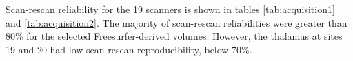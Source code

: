 Scan-rescan reliability for the 19 scanners is shown in tables \ref{tab:acquisition1} and \ref{tab:acquisition2}. The majority of scan-rescan reliabilities were greater than 80\% for the selected Freesurfer-derived volumes. However, the thalamus at sites 19 and 20 had low scan-rescan reproducibility, below 70\%. %